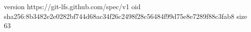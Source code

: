 version https://git-lfs.github.com/spec/v1
oid sha256:8b3482e2e0282bf744d68ac34f26c2498f28c56484f99d75e8e7289f88c3fab8
size 63
